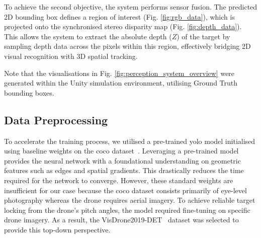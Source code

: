 \documentclass{report_template_oxford}
\begin{document}
To achieve the second objective, the system performs sensor fusion. The predicted 2D bounding box defines a region of interest (Fig. \ref{fig:rgb_data}), which is projected onto the synchronised stereo disparity map (Fig. \ref{fig:depth_data}). This allows the system to extract the absolute depth ($Z$) of the target by sampling depth data across the pixels within this region, effectively bridging 2D visual recognition with 3D spatial tracking. 

Note that the visualisations in Fig. \ref{fig:perception_system_overview} were generated within the Unity simulation environment, utilising Ground Truth bounding boxes. 

        
        
    


\subsection{Data Preprocessing}
To accelerate the training process, we utilised a pre-trained \gls{yolo} model initialised using baseline weights on the \gls{coco} dataset~\cite{Lin2014MicrosoftCC}. Leveraging a pre-trained model provides the neural network with a foundational understanding on geometric features such as edges and spatial gradients. This drastically reduces the time required for the network to converge. However, these standard weights are insufficient for our case because the \gls{coco} dataset consists primarily of eye-level photography whereas the drone requires aerial imagery. To achieve reliable target locking from the drone's pitch angles, the model required fine-tuning on specific drone imagery. As a result, the VisDrone2019-DET~\cite{Zhu2020DetectionAT} dataset was selected to provide this top-down perspective.
\end{document}

